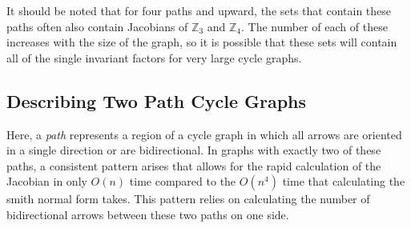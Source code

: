 \documentclass[11pt,reqno]{amsart}
\theoremstyle{definition}
\theoremstyle{plain}
\begin{document}
		It should be noted that for four paths and upward, the sets that contain these paths often also contain
		Jacobians of $\mathbb{Z}_3$ and $\mathbb{Z}_4$.  The number of each of these increases with the size of the
		graph, so it is possible that these sets will contain all of the single invariant factors for very
		large cycle graphs.

	\subsection{Describing Two Path Cycle Graphs}
		Here, a \textit{path} represents a region of a cycle graph in which all arrows are oriented in a single
		direction or are bidirectional.  In graphs with exactly two of these paths, a consistent pattern arises
		that allows for the rapid calculation of the Jacobian in only $O(n)$ time compared to the $O(n^4)$ time
		that calculating the smith normal form takes. This pattern relies on calculating the number
		of bidirectional arrows between these two paths on one side.
\end{document}
